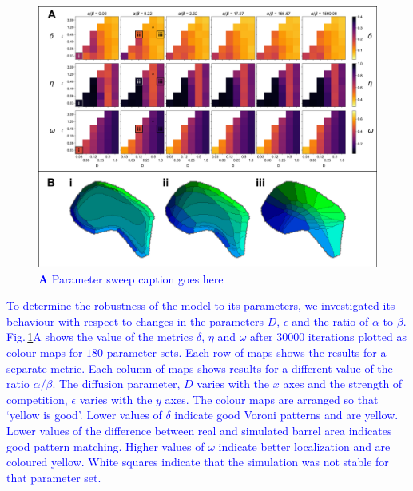 \documentclass[9pt,lineno]{elife}
\newcommand{\cmnt}[1]{\textcolor{blue}{#1}}
\begin{document}
\begin{figure}
  \begin{fullwidth}
    \includegraphics[width=\linewidth]{./Fig2.png}
    \caption{\cmnt{\textbf{A} Parameter sweep caption goes here}}
    \label{fig:paramsweep}
  \end{fullwidth}
\end{figure}

\cmnt{To determine the robustness of the model to its parameters, we
  investigated its behaviour with respect to changes in the parameters $D$,
  $\epsilon$ and the ratio of $\alpha$ to $\beta$. Fig.\,\ref{fig:paramsweep}A
  shows the value of the metrics $\delta$, $\eta$ and $\omega$ after $30000$
  iterations plotted as colour maps for $180$ parameter sets. Each row of maps
  shows the results for a separate metric. Each column of maps shows
  results for a different value of the ratio $\alpha / \beta$. The diffusion
  parameter, $D$ varies with the $x$ axes and the strength of competition,
  $\epsilon$ varies with the $y$ axes. The colour maps are arranged so that
  `yellow is good'. Lower values of $\delta$ indicate good Voroni patterns and
  are yellow. Lower values of the difference between real and simulated barrel
  area indicates good pattern matching. Higher values of $\omega$ indicate
  better localization and are coloured yellow. White squares indicate that the
  simulation was not stable for that parameter set.}
\end{document}
